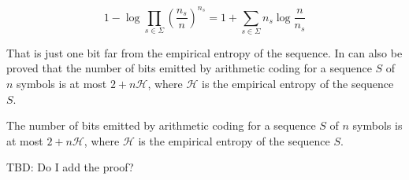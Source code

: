 \begin{equation}
    1 - \log \prod_{s \in \Sigma} \left (\frac{n_s}{n} \right)^{n_s} = 1 + \sum_{s \in \Sigma} n_s \log \frac{n}{n_s}
\end{equation}

\noindent That is just one bit far from the empirical entropy of the sequence. In can also be proved \cite{ferragina2023pearls, han2002mathematics, sayood2002lossless} that the number of bits emitted by arithmetic coding for a sequence $S$ of $n$ symbols is at most $2 + n\mathcal{H}$, where $\mathcal{H}$ is the empirical entropy of the sequence $S$.

\begin{theorem}
    The number of bits emitted by arithmetic coding for a sequence $S$ of $n$ symbols is at most $2 + n\mathcal{H}$, where $\mathcal{H}$ is the empirical entropy of the sequence $S$.
\end{theorem}

TBD: Do I add the proof?
